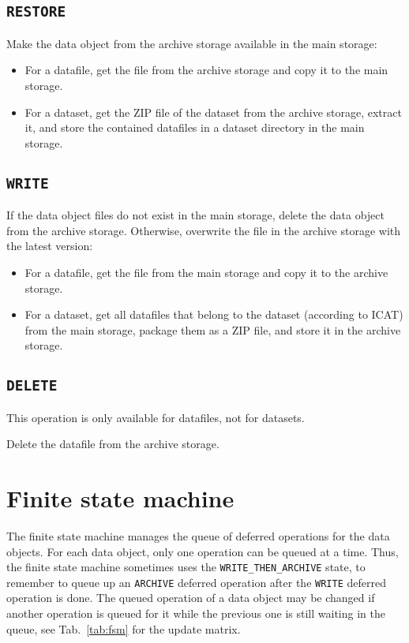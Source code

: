 \documentclass[paper=a4]{scrartcl}
\begin{document}
\subsection{\texttt{RESTORE}}
\label{sec:defops:restore}

Make the data object from the archive storage available in the
main storage:
\begin{itemize}[noitemsep,topsep=0pt]
\item For a datafile, get the file from the archive storage and
copy it to the main storage.
\item For a dataset, get the ZIP file of the dataset from the
archive storage, extract it, and store the contained datafiles in a
dataset directory in the main storage.
\end{itemize}

\subsection{\texttt{WRITE}}
\label{sec:defops:write}

If the data object files do not exist in the main storage, delete
the data object from the archive storage. Otherwise, overwrite the
file in the archive storage with the latest version:
\begin{itemize}[noitemsep,topsep=0pt]
\item For a datafile, get the file from the main storage and copy
it to the archive storage.
\item For a dataset, get all datafiles that belong to the dataset
(according to ICAT) from the main storage, package them as a ZIP
file, and store it in the archive storage.
\end{itemize}

\subsection{\texttt{DELETE}}
\label{sec:defops:delete}

This operation is only available for datafiles, not for datasets.

Delete the datafile from the archive storage.


\section{Finite state machine}
\label{sec:fsm}

The finite state machine manages the queue of deferred operations for
the data objects. For each data object, only one operation can be
queued at a time. Thus, the finite state machine sometimes uses the
\texttt{WRITE\_THEN\_ARCHIVE} state, to remember to queue up an
\texttt{ARCHIVE} deferred operation after the \texttt{WRITE} deferred
operation is done. The queued operation of a data object may be
changed if another operation is queued for it while the previous one
is still waiting in the queue, see Tab.\ \ref{tab:fsm} for the update
matrix.
\end{document}
